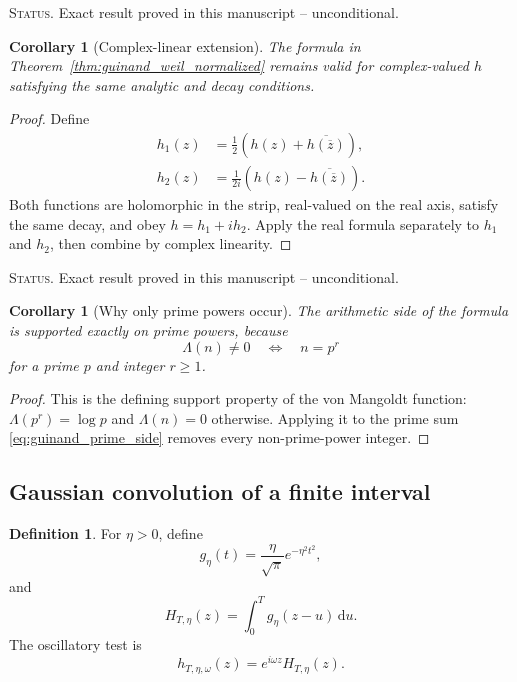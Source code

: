 \documentclass[11pt]{amsart}
\numberwithin{equation}{section}
\theoremstyle{plain}
\newtheorem{corollary}[theorem]{Corollary}
\theoremstyle{definition}
\newtheorem{definition}[theorem]{Definition}
\theoremstyle{remark}
\newcommand{\1}{\mathbf{1}}
\newcommand{\dd}{\,\mathrm{d}}
\newcommand{\statusnote}[1]{%
  \par\smallskip\noindent
  \begingroup\footnotesize\textsc{Status.} #1\endgroup
  \par\smallskip}
\begin{document}
\statusnote{Exact result proved in this manuscript -- unconditional.}
\begin{corollary}[Complex-linear extension]
\label{cor:guinand_complex_extension}
The formula in Theorem~\ref{thm:guinand_weil_normalized} remains valid
for complex-valued \(h\) satisfying the same analytic and decay
conditions.
\end{corollary}

\begin{proof}
Define
\begin{align}
h_1(z)
&=
\frac12\left(h(z)+\overline{h(\overline z)}\right),
\label{eq:complex_extension_h1}
\\
h_2(z)
&=
\frac1{2i}\left(h(z)-\overline{h(\overline z)}\right).
\label{eq:complex_extension_h2}
\end{align}
Both functions are holomorphic in the strip, real-valued on the real
axis, satisfy the same decay, and obey \(h=h_1+ih_2\).  Apply the real
formula separately to \(h_1\) and \(h_2\), then combine by complex
linearity.
\end{proof}

\statusnote{Exact result proved in this manuscript -- unconditional.}
\begin{corollary}[Why only prime powers occur]
\label{cor:explicit_formula_prime_power_support}
The arithmetic side of the formula is supported exactly on prime powers,
because
\begin{equation}
\Lambda(n)\neq0
\quad\Longleftrightarrow\quad
n=p^r
\label{eq:von_mangoldt_support}
\end{equation}
for a prime \(p\) and integer \(r\geq1\).
\end{corollary}

\begin{proof}
This is the defining support property of the von Mangoldt function:
\(\Lambda(p^r)=\log p\) and \(\Lambda(n)=0\) otherwise.  Applying it to
the prime sum \eqref{eq:guinand_prime_side} removes every non-prime-power
integer.
\end{proof}

\subsection{Gaussian convolution of a finite interval}
\label{subsec:gaussian_convolution}

\begin{definition}
\label{def:gaussian_kernel_detailed}
For $\eta>0$, define
\begin{equation}
g_\eta(t)
=
\frac{\eta}{\sqrt\pi}e^{-\eta^2t^2},
\label{eq:gaussian_kernel_detailed}
\end{equation}
and
\begin{equation}
H_{T,\eta}(z)
=
\int_0^Tg_\eta(z-u)\dd u.
\label{eq:H_T_eta_detailed}
\end{equation}
The oscillatory test is
\begin{equation}
h_{T,\eta,\omega}(z)
=
e^{i\omega z}H_{T,\eta}(z).
\label{eq:h_T_eta_omega_detailed}
\end{equation}
\end{definition}
\end{document}
